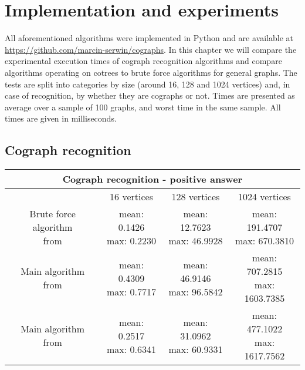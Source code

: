 \section{Implementation and experiments}

All aforementioned algorithms were implemented in Python and are available at \url{https://github.com/marcin-serwin/cographs}. In this chapter we will compare the experimental execution times of cograph recognition algorithms and compare algorithms operating on cotrees to brute force algorithms for general graphs. The tests are split into categories by size (around 16, 128 and 1024  vertices) and, in case of recognition, by whether they are cographs or not. Times are presented as average over a sample of 100 graphs, and worst time in the same sample. All times are given in milliseconds.

\subsection{Cograph recognition}

\begin{center}

    \begin{tabular}{ |c|c|c|c|}
        \hline
        \multicolumn{4}{|c|}{Cograph recognition - positive answer} \\
        \hline
         & 16 vertices & 128 vertices & 1024 vertices               \\
        \hline
        \makecell{Brute force algorithm                             \\ from \cite{habib}} & \makecell{mean: 0.1426                                \\ max: 0.2230} & \makecell{mean: 12.7623 \\ max: 46.9928} & \makecell{mean: 191.4707 \\ max: 670.3810} \\
        \hline
        \makecell{Main algorithm                                    \\ from \cite{habib}} & \makecell{mean: 0.4309                                \\ max: 0.7717} & \makecell{mean: 46.9146 \\ max: 96.5842} & \makecell{mean: 707.2815 \\ max: 1603.7385} \\
        \hline
        \makecell{Main algorithm                                    \\ from \cite{corneil}} & \makecell{mean: 0.2517                                \\ max: 0.6341} & \makecell{mean: 31.0962 \\ max: 60.9331} & \makecell{mean: 477.1022 \\ max: 1617.7562} \\
        \hline
    \end{tabular}
\end{center}

